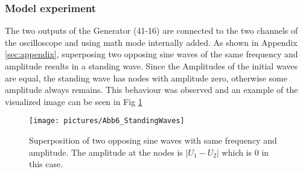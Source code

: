 \documentclass[a4paper,10pt,twocolumn]{article}
\begin{document}
    \subsubsection{Model experiment}
    The two outputs of the Generator (41-16) are connected to the two channels of the oscilloscope and using math mode internally added.
    As shown in Appendix \ref{sec:appendix}, superposing two opposing sine waves of the same frequency and amplitude results in a standing wave.
    Since the Amplitudes of the initial waves are equal, the standing wave has nodes with amplitude zero, otherwise some amplitude always remains.
    This behaviour was observed and an example of the visualized image can be seen in Fig \ref{fig:standingWaves}
    \begin{figure}
        \begin{center}
            \texttt{[image: pictures/Abb6\_StandingWaves]}
            \caption[]{Superposition of two opposing sine waves with same frequency and amplitude. The amplitude at the nodes is $|U_1 - U_2|$ which is 0 in this case.}   %
            \label{fig:standingWaves}
        \end{center}
    \end{figure}
\end{document}
